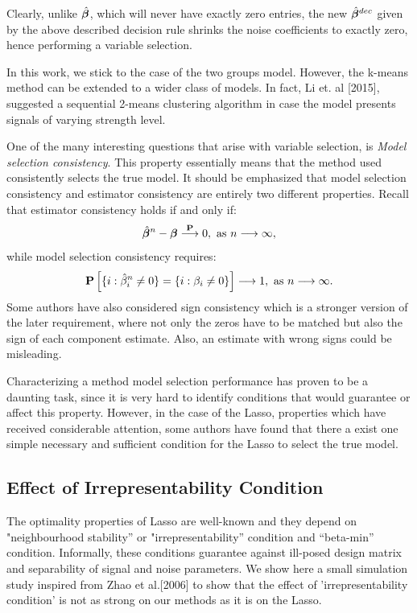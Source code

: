 \documentclass[chapters]{uamaththesis}
\begin{document}
Clearly, unlike $\hat{\boldsymbol{\beta}}$, which will never have exactly zero entries, the new $\hat{\boldsymbol{\beta}}^{dec}$ given by the above described decision rule shrinks the noise coefficients to exactly zero, hence performing a variable selection.

In this work, we stick to the case of the two groups model. However, the k-means method can be extended to a wider class of models. In fact, Li \rm{et. al} [2015], suggested a sequential 2-means clustering algorithm in case the model presents signals of varying strength level.

One of the many interesting questions that arise with variable selection, is \textit{Model selection consistency}. This property essentially means that the method used consistently selects the true model. It should be emphasized that model selection consistency and estimator consistency are entirely two different properties. Recall that estimator consistency holds if and only if:\[ \hat{\boldsymbol{\beta}}^{n} -  \boldsymbol{\beta} \stackrel{{\bf P}}{\longrightarrow}0, \ \text{as } n\longrightarrow \infty,  \]
while model selection consistency requires:
\[ \P\left[ \lbrace i : \hat{\beta}_i^{n} \neq 0 \rbrace = \lbrace i : \beta_i \neq 0\rbrace \right] \longrightarrow 1, \ \text{as } n\longrightarrow \infty. \]
Some authors have also considered sign consistency which is a stronger version of the later requirement, where not only the zeros have to be matched but also the sign of each component estimate. Also, an estimate with wrong signs could be misleading. 

Characterizing a method model selection performance has proven to be a daunting task, since it is very hard to identify conditions that would guarantee or affect this property. However, in the case of the Lasso, properties which have received considerable attention, some authors have found that there a exist one simple necessary and sufficient condition for the Lasso to select the true model.

\subsection{Effect of Irrepresentability Condition}


The optimality properties of Lasso are well-known and they depend on "neighbourhood stability'' or "irrepresentability'' condition and ``beta-min'' condition. Informally, these conditions guarantee against ill-posed design matrix and separability of signal and noise parameters. We show here a small simulation study inspired from Zhao et al.[2006] to show that the effect of 'irrepresentability condition' is not as strong on our methods as it is on the Lasso.
\end{document}
